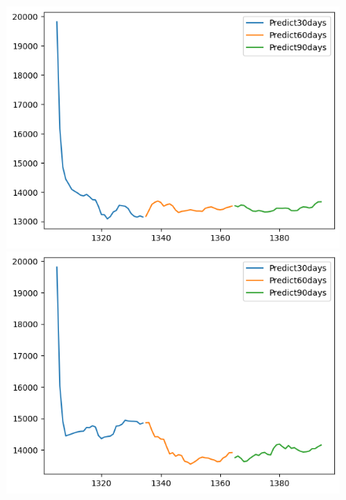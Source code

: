 \begin{figure}[H]
\begin{minipage}{0.15\textwidth}
    \includegraphics[width=1\textwidth]{resources/chapter-5/newdata1/predicted/KF_EXIM_7_3_30days.png}
    \end{minipage}
    \hfill
    \begin{minipage}{0.15\textwidth}
    \centering
    \includegraphics[width=1\textwidth]{resources/chapter-5/newdata1/predicted/KF_EXIM_8_2_30days.png}
    \end{minipage}
    \hfill
        \begin{minipage}{0.15\textwidth}
    \centering

\end{minipage}
\end{figure}
